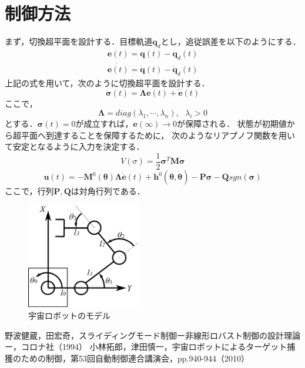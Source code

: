 \documentclass[10pt, a4j, uplatex, dvipdfmx, twocolumn]{jsarticle}
\begin{document}
\section{制御方法}
まず，切換超平面を設計する．目標軌道$\bm{q}_d$とし，追従誤差を以下のようにする．
\begin{align}
    \bm{e}(t)=\bm{q}(t)-\bm{q}_d(t)\\
    \dot{\bm{e}(t)}=\dot{\bm{q}}(t)-\dot{\bm{q}}_d(t)
\end{align}
上記の式を用いて，次のように切換超平面を設計する．
\begin{equation}
    \bm{\sigma}(t)=\bm{\Lambda}\bm{e}(t)+\dot{\bm{e}}(t)
\end{equation}
ここで，
\begin{equation*}
    \bm{\Lambda}=diag(\lambda_1,\cdots,\lambda_n),\ \ \ \lambda_i >0
\end{equation*}
とする．$\bm{\sigma}(t)=0$が成立すれば，$\bm{e}(\infty)\rightarrow 0$が保障される．
状態が初期値から超平面へ到達することを保障するために，
次のようなリアプノフ関数を用いて安定となるように入力を決定する．
\begin{equation}
    V(\sigma)=\frac{1}{2}\bm{\sigma}^T\bm{M}\bm{\sigma}
\end{equation}
\begin{equation}
    \bm{u}(t)=-\bm{M}^0(\bm{\theta})\bm{\Lambda}\dot{\bm{e}}(t)+\bm{h}^0(\bm{\theta},\dot{\bm{\theta}})-\bm{P\sigma}-\bm{Q}sgn(\bm{\sigma})
\end{equation}
ここで，行列$\bm{P},\bm{Q}$は対角行列である．
\begin{figure}[t]
    \centering
    \includegraphics[width=50mm]{space_robot_model.pdf}
    \caption{宇宙ロボットのモデル}
    \label{space}
\end{figure}


\begin{thebibliography}{9}
野波健蔵，田宏奇，スライディングモード制御ー非線形ロバスト制御の設計理論ー，コロナ社（1994）
小林拓郎，津田慎一，宇宙ロボットによるターゲット捕獲のための制御，第53回自動制御連合講演会，pp.940-944（2010）
\end{thebibliography}
\end{document}
